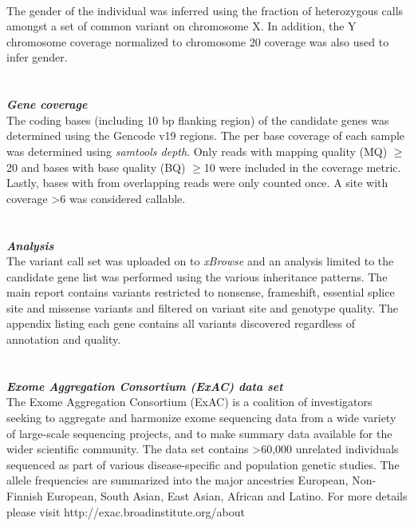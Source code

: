 \\
The gender of the individual was inferred using the fraction of heterozygous calls amongst a set of common variant on chromosome X. In addition, the Y chromosome coverage 
normalized to chromosome 20 coverage was also used to infer gender.
\\ \\ \\
{\large \textbf{\textit{Gene coverage}}}
\\
The coding bases (including 10 bp flanking region) of the candidate genes was determined using the Gencode v19 regions. The per base coverage of each
sample was determined using \textit{samtools depth}. Only reads with mapping quality (MQ) $\geq$20 and bases with base quality (BQ) $\geq$10
were included in the coverage metric. Lastly, bases with from overlapping reads were only counted once. A site with coverage \textgreater6 was considered
callable.  
\\ \\ \\
{\large \textbf{\textit{Analysis}}}
\\
The variant call set was uploaded on to \textit{xBrowse} and an analysis limited to the candidate gene list was performed using the various 
inheritance patterns. The main report contains variants restricted to nonsense, frameshift, essential splice site and missense variants and filtered on variant site and genotype quality. The appendix listing each gene contains all variants discovered regardless of annotation and quality.
\\ \\ \\
{\large \textbf{\textit{Exome Aggregation Consortium (ExAC) data set}}}
\\
The Exome Aggregation Consortium (ExAC) is a coalition of investigators seeking to aggregate and harmonize exome sequencing data from a wide variety of large-scale sequencing projects, and to make summary data available for the wider scientific community. The data set contains \textgreater60,000 unrelated individuals sequenced as part of various disease-specific and population genetic studies. The allele frequencies are summarized into the major ancestries European, Non-Finnish European, South Asian, East Asian, African and Latino. For more details please visit http://exac.broadinstitute.org/about
\\ \\ \\

